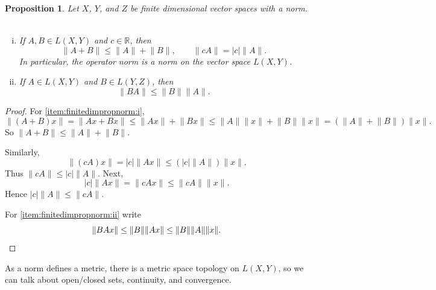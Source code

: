\documentclass[12pt]{book}
\newcommand{\snorm}[1]{\lVert {#1} \rVert}
\newcommand{\abs}[1]{\left\lvert {#1} \right\rvert}
\newcommand{\R}{{\mathbb{R}}}
\theoremstyle{plain}
\newtheorem{prop}[thm]{Proposition}
\theoremstyle{remark}
\theoremstyle{definition}
\theoremstyle{exercise}
\theoremstyle{example}
\begin{document}
\begin{prop} \label{prop:finitedimpropnorm}
Let $X$, $Y$, and $Z$ be finite dimensional vector spaces with a norm.
{\ }
\begin{enumerate}[(i)]
\item \label{item:finitedimpropnorm:i}
If $A,B \in L(X,Y)$ and $c \in \R$, then
\begin{equation*}
\snorm{A+B} \leq \snorm{A}+\snorm{B}, \qquad \snorm{cA} = \abs{c}\snorm{A} .
\end{equation*}
In particular, the operator norm is a norm on the vector space $L(X,Y)$.
\item \label{item:finitedimpropnorm:ii}
If $A \in L(X,Y)$ and $B \in L(Y,Z)$, then
\begin{equation*}
\snorm{BA} \leq \snorm{B} \snorm{A} .
\end{equation*}
\end{enumerate}
\end{prop}

\begin{proof}
For \ref{item:finitedimpropnorm:i},
\begin{equation*}
\snorm{(A+B)x} =
\snorm{Ax+Bx} \leq
\snorm{Ax}+\snorm{Bx} \leq
\snorm{A} \snorm{x}+\snorm{B}\snorm{x} =
(\snorm{A}+\snorm{B}) \snorm{x} .
\end{equation*}
So $\snorm{A+B} \leq \snorm{A}+\snorm{B}$.

Similarly,
\begin{equation*}
\snorm{(cA)x} =
\abs{c} \snorm{Ax} \leq (\abs{c}\snorm{A}) \snorm{x} .
\end{equation*}
Thus $\snorm{cA} \leq \abs{c}\snorm{A}$.  Next,
\begin{equation*}
\abs{c} \snorm{Ax}
=
\snorm{cAx} \leq \snorm{cA} \snorm{x} .
\end{equation*}
Hence $\abs{c}\snorm{A} \leq \snorm{cA}$.

For \ref{item:finitedimpropnorm:ii} write
\begin{equation*}
\snorm{BAx} \leq \snorm{B} \snorm{Ax} \leq \snorm{B} \snorm{A} \snorm{x} .
\qedhere
\end{equation*}
\end{proof}

As a norm defines a metric,
there is
a metric space topology on $L(X,Y)$, so we can talk
about open/closed sets, continuity, and convergence.
\end{document}
